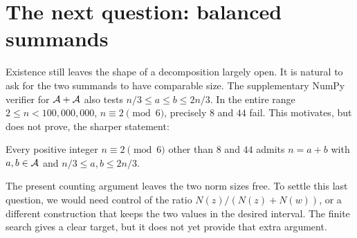 \section{The next question: balanced summands}\label{sec:balanced}
Existence still leaves the shape of a decomposition largely open. It is
natural to ask for the two summands to have comparable size.
The supplementary NumPy verifier for $\AA+\AA$ also tests $n/3\le a\le b\le2n/3$. In the entire range
$2\le n<100{,}000{,}000$, $n\equiv2\pmod6$, precisely $8$ and $44$
fail. This motivates, but does not prove, the sharper statement:
\begin{conjecture}
Every positive integer $n\equiv2\pmod6$ other than $8$ and $44$ admits $n=a+b$ with
$a,b\in\AA$ and $n/3\le a,b\le2n/3$.
\end{conjecture}
The present counting argument leaves the two norm sizes free. To settle
this last question, we would need control of the ratio
$N(z)/(N(z)+N(w))$, or a different construction that keeps the two values
in the desired interval. The finite search gives a clear target, but it
does not yet provide that extra argument.
